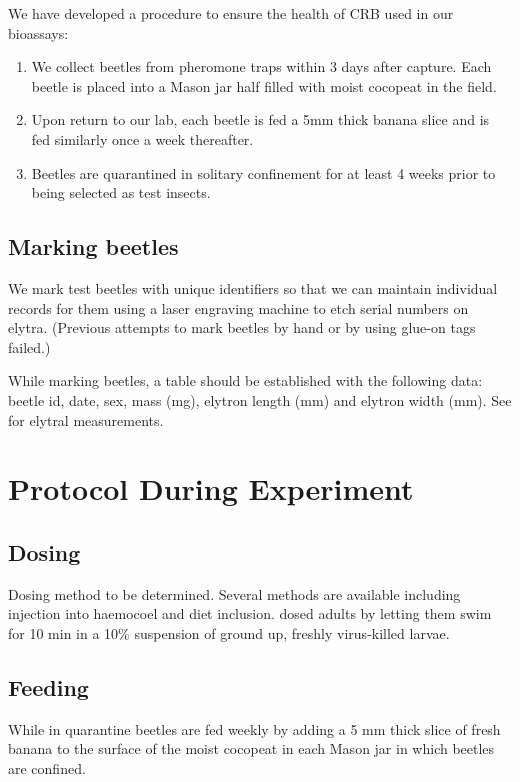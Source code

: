 \documentclass[twocolumn, 12pt,letterpaper,english,bibliography=totocnumbered, abstract=on]{scrartcl}
\begin{document}
We have developed a procedure to ensure the health of CRB used in our bioassays:
\begin{enumerate}
	\item We collect beetles from pheromone traps within 3 days after capture. Each beetle is placed into a Mason jar half filled with moist cocopeat in the field.  
	\item Upon return to our lab, each beetle is fed a 5mm thick banana slice and is fed similarly once a week thereafter.
	\item Beetles are quarantined in solitary confinement for at least 4 weeks prior to being selected as test insects.
\end{enumerate}

\subsection{Marking beetles}

We mark test beetles with unique identifiers so that we can maintain individual records for them using a laser engraving machine to etch serial numbers on elytra. (Previous attempts to mark beetles by hand or by using glue-on tags failed.)

While marking beetles, a table should be established with the following data: beetle id, date, sex, mass (mg), elytron length (mm) and elytron width (mm). See \cite{vandermeer1975} for elytral measurements.

\section{Protocol During Experiment} 

\subsection{Dosing}

Dosing method to be determined. Several methods are available including injection into haemocoel and  diet inclusion. \cite{zelazny1977} dosed adults by letting them swim for 10 min in a 10\% suspension of ground up, freshly virus-killed larvae.  

\subsection{Feeding}

While in quarantine beetles are fed weekly by adding a 5 mm thick slice of fresh banana to the surface of the moist cocopeat in each Mason jar in which beetles are confined.
\end{document}
